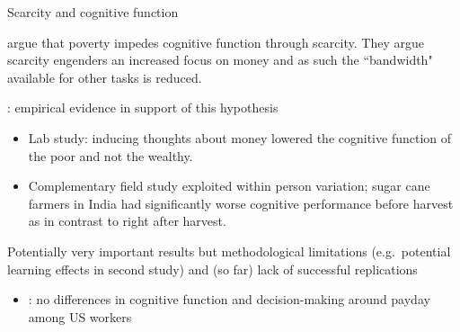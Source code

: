 \documentclass[aspectratio=169, 10pt, handout]{beamer}
\newenvironment{wideitemize}{\itemize\addtolength{\itemsep}{10pt}}{\enditemize}
\begin{document}
\begin{frame}{Scarcity and cognitive function}

\begin{wideitemize}

	\item \cite{mullainathan2013scarcity} argue that poverty impedes cognitive function through scarcity. They argue scarcity engenders an increased focus on money and as such the ``bandwidth" available for other tasks is reduced.

	\item \cite{mani2013poverty}: empirical evidence in support of this hypothesis
	
	\smallskip
	
	\begin{itemize}
	
	    \item Lab study: inducing thoughts about money lowered the cognitive function of the poor and not the wealthy.

    \smallskip
    
	    \item Complementary field study exploited within person variation; sugar cane farmers in India had significantly worse cognitive performance before harvest as in contrast to right after harvest.
	    
	\end{itemize}
	
	\item Potentially very important results but methodological limitations (e.g.\ potential learning effects in second study) and (so far) lack of successful replications
	
	\begin{itemize}
	    
	    \smallskip
	    
	    \item \cite{carvalho2016poverty}: no differences in cognitive function and decision-making around payday among US workers
	    
	\end{itemize}
	
\end{wideitemize}

\end{frame}
\end{document}
